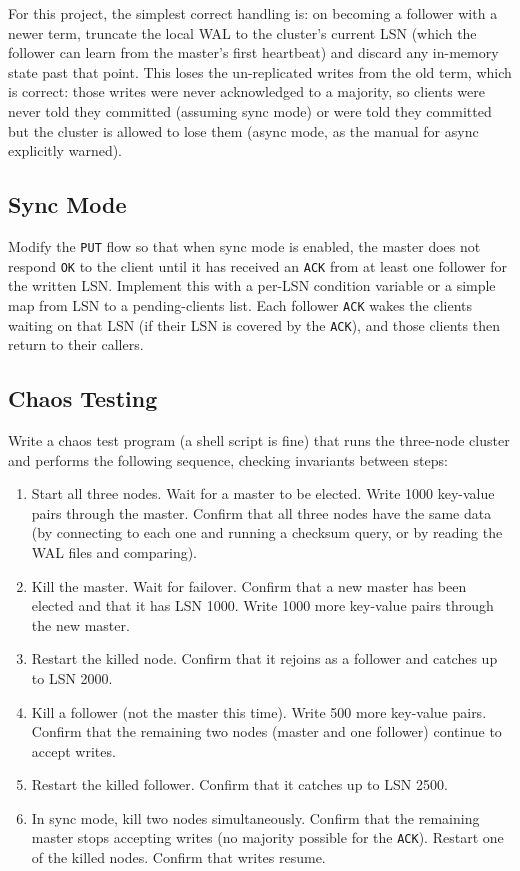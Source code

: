 \documentclass[11pt,a4paper]{article}
\begin{document}
For this project, the simplest correct handling is: on becoming a follower with a newer term, truncate the local WAL to the cluster's current LSN (which the follower can learn from the master's first heartbeat) and discard any in-memory state past that point. This loses the un-replicated writes from the old term, which is correct: those writes were never acknowledged to a majority, so clients were never told they committed (assuming sync mode) or were told they committed but the cluster is allowed to lose them (async mode, as the manual for async explicitly warned).

\subsection{Sync Mode}
Modify the \texttt{PUT} flow so that when sync mode is enabled, the master does not respond \texttt{OK} to the client until it has received an \texttt{ACK} from at least one follower for the written LSN. Implement this with a per-LSN condition variable or a simple map from LSN to a pending-clients list. Each follower \texttt{ACK} wakes the clients waiting on that LSN (if their LSN is covered by the \texttt{ACK}), and those clients then return to their callers.

\subsection{Chaos Testing}
Write a chaos test program (a shell script is fine) that runs the three-node cluster and performs the following sequence, checking invariants between steps:

\begin{enumerate}
\item Start all three nodes. Wait for a master to be elected. Write 1000 key-value pairs through the master. Confirm that all three nodes have the same data (by connecting to each one and running a checksum query, or by reading the WAL files and comparing).
\item Kill the master. Wait for failover. Confirm that a new master has been elected and that it has LSN 1000. Write 1000 more key-value pairs through the new master.
\item Restart the killed node. Confirm that it rejoins as a follower and catches up to LSN 2000.
\item Kill a follower (not the master this time). Write 500 more key-value pairs. Confirm that the remaining two nodes (master and one follower) continue to accept writes.
\item Restart the killed follower. Confirm that it catches up to LSN 2500.
\item In sync mode, kill two nodes simultaneously. Confirm that the remaining master stops accepting writes (no majority possible for the \texttt{ACK}). Restart one of the killed nodes. Confirm that writes resume.
\end{enumerate}
\end{document}
